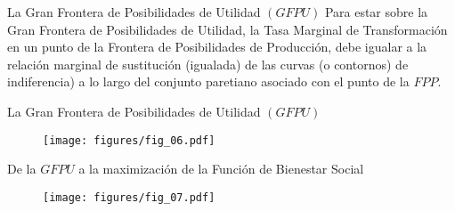 \begin{frame}{La Gran Frontera de Posibilidades de Utilidad $(GFPU)$}
	Para estar sobre la Gran Frontera de Posibilidades de Utilidad, la Tasa Marginal de Transformación en un punto de la Frontera de Posibilidades de Producción, debe igualar a la relación marginal de sustitución (igualada) de las curvas (o contornos) de indiferencia) a lo largo del conjunto paretiano asociado con el punto de la $FPP$.
\end{frame}
\begin{frame}{La Gran Frontera de Posibilidades de Utilidad $(GFPU)$}
	\begin{figure}[!h]
		\centering
		 \texttt{[image: figures/fig\_06.pdf]}
	\end{figure}
\end{frame}
\begin{frame}{De la $GFPU$ a la maximización de la Función de Bienestar Social}
	\begin{figure}[!h]
		\centering
		\texttt{[image: figures/fig\_07.pdf]}
	\end{figure}
\end{frame}